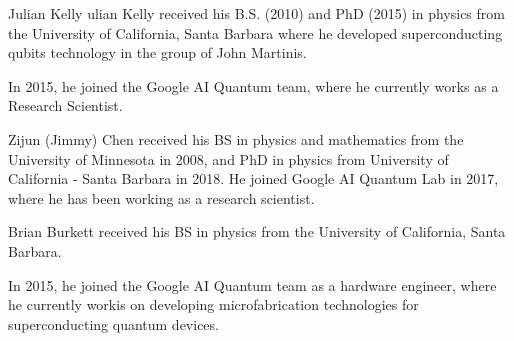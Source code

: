 \documentclass[journal]{IEEEtran}
\begin{document}
\begin{IEEEbiography}{Julian Kelly} ulian Kelly received his B.S. (2010) and PhD (2015) in physics from the University of California, Santa Barbara where he developed superconducting qubits technology in the group of John Martinis. 

In 2015, he joined the Google AI Quantum team, where he currently works as a Research Scientist. 


\end{IEEEbiography}
\begin{IEEEbiography}{Zijun (Jimmy) Chen} received his BS in physics and mathematics from the University of Minnesota in 2008, and PhD in physics from University of California - Santa Barbara in 2018. He joined Google AI Quantum Lab in 2017, where he has been working as a research scientist.


\end{IEEEbiography}
\begin{IEEEbiography}{Brian Burkett} received his BS in physics from the University of California, Santa Barbara.  

In 2015, he joined the Google AI Quantum team as a hardware engineer, where he currently workis on developing microfabrication technologies for superconducting quantum devices.


\end{IEEEbiography}
\end{document}
